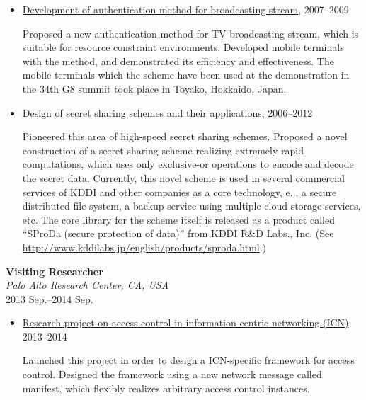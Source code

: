 \begin{itemize}
\item \hspace*{4ex}
\underline{Development of authentication method for broadcasting stream},
2007--2009\\[0.5ex]
\hspace*{6ex}
\begin{minipage}{0.9\linewidth}
Proposed a new authentication method for TV broadcasting stream, which is suitable for
resource constraint environments. Developed mobile terminals with the
 method, and demonstrated its efficiency and effectiveness.
The mobile terminals which the scheme have been used at the
 demonstration in the 34th G8 summit took place in Toyako, Hokkaido, Japan.
\end{minipage}

\item \hspace*{4ex}
\underline{Design of secret sharing schemes and their applications},
2006--2012\\[0.5ex]
\hspace*{6ex}
\begin{minipage}{0.9\linewidth}
Pioneered this area of high-speed secret sharing schemes. Proposed a
 novel construction of a secret sharing scheme realizing extremely rapid
 computations, which uses only exclusive-or operations to encode and
 decode the secret data.
Currently, this novel scheme is used in several commercial services of
 KDDI and other companies as a core technology,
 e.\@g.\@, a secure distributed file system, a backup
 service using multiple cloud storage services, etc.
The core library for the scheme itself is released as a product called ``SProDa (secure protection of data)'' from KDDI R\&D Labs., Inc. (See \href{http://www.kddilabs.jp/english/products/sproda.html}{http://www.kddilabs.jp/english/products/sproda.html}.)
\end{minipage}
\end{itemize}

\textbf{Visiting Researcher}\\
\hspace*{4ex}\textit{Palo Alto Research Center, CA, USA}\\
\hspace*{4ex} 2013 Sep.--2014 Sep.


\begin{itemize}
\item \hspace*{4ex}
\underline{Research project on access control in information centric networking (ICN)},
2013--2014\\[0.5ex]
\hspace*{6ex}
\begin{minipage}{0.9\linewidth}
Launched this project in order to design a ICN-specific framework for access control. Designed the framework using a new network message called manifest, which flexibly realizes arbitrary access control instances.
\end{minipage}

\end{itemize}

